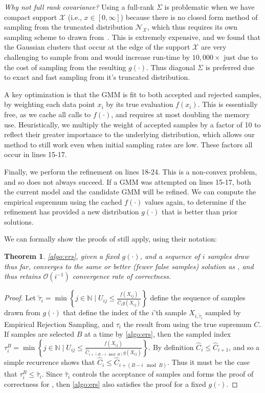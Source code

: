 \documentclass{ecai}  %
\newtheorem{theorem}{Theorem}[section]
\begin{document}
\textit{Why not full rank covariance?} Using a full-rank $\Sigma$ is problematic when we have compact support $\mathcal{X}$ (i.e., $x \in [0, \infty]$) because there is no closed form method of sampling from the truncated distribution $\mathcal{N}_\mathcal{X}$, which thus requires its own sampling scheme to drawn from~\cite{Wilhelm2010}. This is extremely expensive, and we found that the Gaussian clusters that occur at the edge of the support $\mathcal{X}$ are very challenging to sample from and would increase run-time by $10,000\times$ just due to the cost of sampling from the resulting $g(\cdot)$. Thus diagonal $\Sigma$ is preferred due to exact and fast sampling from it's truncated distribution. 

A key optimization is that the GMM is fit to both accepted and rejected samples, by weighting each data point $x_i$ by its true evaluation $f(x_i)$. This is essentially free, as we cache all calls to $f(\cdot)$, and requires at most doubling the memory use. Heuristically, we multiply the weight of accepted samples by a factor of 10 to reflect their greater importance to the underlying distribution, which allows our method to still work even when initial sampling rates are low. These factors all occur in  lines 15-17. 
%

Finally, we perform the refinement on lines 18-24. This is a non-convex problem, and so does not always succeed. If a GMM was attempted on lines 15-17, both the current model and the candidate GMM will be refined. We can compute the empirical supremum using the cached $f(\cdot)$ values again, to determine if the refinement has provided a new distribution $g(\cdot)$ that is better than prior solutions. 

We can formally show the proofs of \cite{Caffo2002} still apply, using their notation:
\begin{theorem} \autoref{algo:ers}, given a fixed $g(\cdot)$, and a sequence of $i$ samples draw thus far, converges to the same or better (fewer false samples) solution as \cite{Caffo2002}, and thus retains $\mathcal{O}(i^{-1})$ convergence rate of correctness. 
\end{theorem}
\begin{proof}
Let $\widetilde{\tau}_{i}=\min \left\{j \in \mathbb{N} \mid U_{i j} \leqslant \frac{f\left(X_{i j}\right)}{\widehat{C}_{i} g\left(X_{i j}\right)}\right\}$ define the sequence of samples drawn from $g(\cdot)$ that define the index of the $i$'th sample $X_{i, \widetilde{\tau}_i}$ sampled by Empirical Rejection Sampling, and $\tau_i$ the result from using the true supremum $C$. If samples are selected $B$ at a time by \autoref{algo:ers}, then the sampled index $\tau^B_i  = \min \left\{j \in \mathbb{N} \mid U_{i j} \leqslant \frac{f\left(X_{i j}\right)}{\widehat{C}_{i + (B-i \mod B)} g\left(X_{i j}\right)}\right\}$. By definition $\widehat{C}_{i} \leq \widehat{C}_{i+1}$, and so a simple recurrence shows that $\widehat{C}_i \leq \widehat{C}_{i + (B-i \mod B)}$. Thus it must be the case that $\tau^B_i \leq \widetilde{\tau_i}$. Since $\widetilde{\tau_i}$ controls the acceptance of samples and forms the proof of correctness for \cite{Caffo2002}, then \autoref{algo:ers} also satisfies the proof for a fixed $g(\cdot)$. 
\end{proof}
\end{document}
